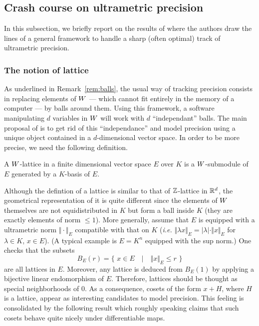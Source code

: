 \documentclass{article}
\begin{document}
\subsection{Crash course on ultrametric precision}

In this subsection, we briefly report on the results of \cite{padicprec} 
where the authors draw the lines of a general framework to handle a 
sharp (often optimal) track of ultrametric precision.

\subsubsection*{The notion of lattice}

As underlined in Remark~\ref{rem:balls}, the usual way of tracking 
precision consists in replacing elements of $W$ --- which cannot fit 
entirely in the memory of a computer --- by balls around them. Using 
this framework, a software manipulating $d$ variables in $W$ will work 
with $d$ ``independant'' balls. The main proposal of \cite{padicprec} is 
to get rid of this ``independance'' and model precision using a unique
object contained in a $d$-dimensional vector space. In order to be more
precise, we need the following definition.

\begin{deftn}
A $W$-lattice in a finite dimensional vector space $E$ over $K$ is
a $W$-submodule of $E$ generated by a $K$-basis of $E$.
\end{deftn}

Although the defintion of a lattice is similar to that of $\mathbb Z$-lattice 
in $\mathbb R^d$, the geometrical representation of it is quite different since 
the elements of $W$ themselves are not equidistributed in $K$ but form 
a ball inside $K$ (they are exactly elements of norm $\leq 1$). More 
generally, assume that $E$ is equipped with a ultrametric norm $\Vert 
\cdot \Vert_E$ compatible with that on $K$ (\emph{i.e.} $\Vert \lambda x 
\Vert_E = |\lambda| \cdot \Vert x \Vert_E$ for $\lambda \in K$, $x \in 
E$). (A typical example is $E = K^n$ equipped with the sup norm.) One
checks that the subsets
$$B_E(r) = \big\{ \,\, x \in E \quad|\quad \Vert x \Vert_E \leq r \,\,\big\}$$
are all lattices in $E$. Moreover, any lattice is deduced from $B_E(1)$ 
by applying a bijective linear endomorphism of $E$. Therefore, lattices 
should be thought as special neighborhoods of $0$. As a consequence, 
cosets of the form $x + H$, where $H$ is a lattice, appear as 
interesting candidates to model precision. This feeling is consolidated 
by the following result which roughly speaking claims that such cosets 
behave quite nicely under differentiable maps.
\end{document}
